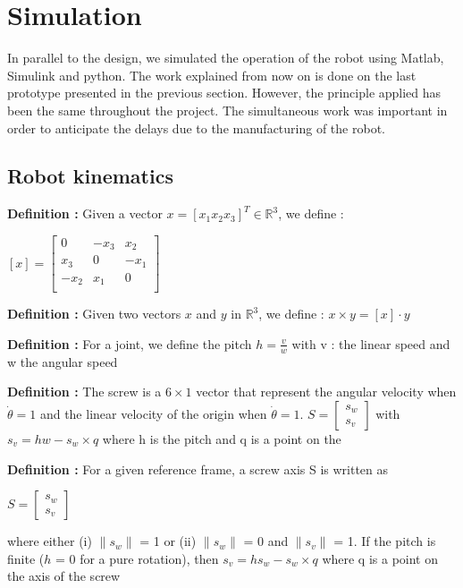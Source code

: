 \section{Simulation}\insertloftspace
\setcounter{figure}{0}\setcounter{table}{0}

\hspace{\parindent} In parallel to the design, we simulated the operation of the robot using Matlab, Simulink and python. The work explained from now on is done on the last prototype presented in the previous section. However, the principle applied has been the same throughout the project. The simultaneous work was important in order to anticipate the delays due to the manufacturing of the robot. 

\subsection{Robot kinematics}

\textbf{Definition :} Given a vector $x=[x_1 x_2 x_3]^T \in \mathbb{R}^3$, we define : 
\begin{center}
    $[x] = \begin{bmatrix}
        0 & -x_3 & x_2 \\
        x_3 & 0 & -x_1 \\
        -x_2 & x_1 & 0 \\
    \end{bmatrix}$
\end{center}

\noindent\textbf{Definition :} Given two vectors $x$ and $y$ in $\mathbb{R}^3$, we define : $x\times y = [x]\cdot y$

\bigbreak
\noindent\textbf{Definition :} For a joint, we define the pitch $h = \frac{v}{w}$ with v : the linear speed and w the angular speed

\bigbreak
\noindent\textbf{Definition :} The screw is a $6\times1$ vector that represent the angular velocity when $\dot{\theta}=1$ and the linear velocity of the origin when $\dot{\theta}=1$. $S = \begin{bmatrix} s_w\\s_v\end{bmatrix}$ with $s_v = hw-s_w\times q$ where h is the pitch and q is a point on the 

\noindent\textbf{Definition :} For a given reference frame, a screw axis S is written as 
\begin{center}
    $S=\begin{bmatrix}
        s_w\\s_v
    \end{bmatrix}$
\end{center}
where either (i) $\|s_w\|$ = 1 or (ii) $\|s_w\|$ = 0 and $\|s_v\|$ = 1. If the pitch is finite ($h$ = 0 for a pure rotation), then $s_v = hs_w-s_w\times q$ where q is a point on the axis of the screw

